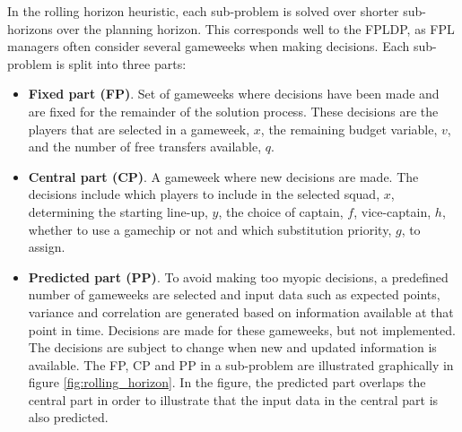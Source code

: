 \newpar

In the rolling horizon heuristic, each sub-problem is solved over shorter sub-horizons over the planning horizon. This corresponds well to the FPLDP, as FPL managers often consider several gameweeks when making decisions. Each sub-problem is split into three parts:
\begin{itemize}
    \item \textbf{Fixed part (FP)}. Set of gameweeks where decisions have been made and are fixed for the remainder of the solution process. These decisions are the players that are selected in a gameweek, $x$, the remaining budget variable, $v$, and the number of free transfers available, $q$.
    \item \textbf{Central part (CP)}. A gameweek where new decisions are made. The decisions include which players to include in the selected squad, $x$, determining the starting line-up, $y$, the choice of captain, $f$,  vice-captain, $h$, whether to use a gamechip or not and which substitution priority, $g$, to assign.  
    \item \textbf{Predicted part (PP)}. To avoid making too myopic decisions, a predefined number of gameweeks are selected and input data such as expected points, variance and correlation are generated based on information available at that point in time. Decisions are made for these gameweeks, but not implemented.  The decisions are subject to change when new and updated information is available. The FP, CP and PP in a sub-problem are illustrated graphically in figure \ref{fig:rolling_horizon}. In the figure, the predicted part overlaps the central part in order to illustrate that the input data in the central part is also predicted.
\end{itemize}

